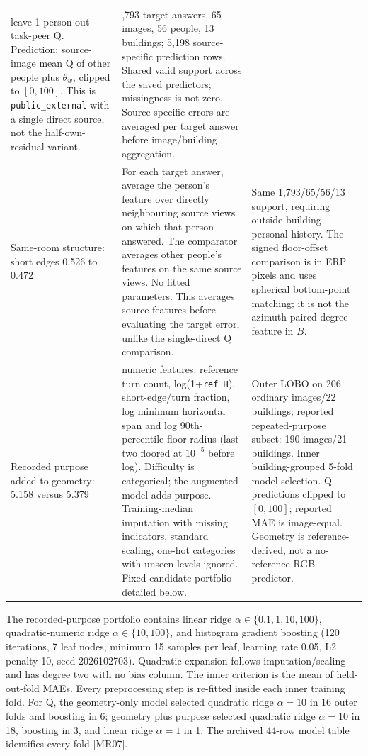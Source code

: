 \begin{longtable}{>{\raggedright\arraybackslash}p{.19\linewidth}>{\raggedright\arraybackslash}p{.49\linewidth}>{\raggedright\arraybackslash}p{.23\linewidth}}
leave-1-person-out task-peer Q.
Prediction: source-image mean Q of other people plus $\theta_w$,
clipped to $[0,100]$.
This is \texttt{public\_external} with a single direct source,
not the half-own-residual variant.
&
1,793 target answers, 65 images, 56 people, 13 buildings;
5,198 source-specific prediction rows.
Shared valid support across the saved predictors; missingness is not zero.
Source-specific errors are averaged per target answer before
image/building aggregation.
\\[3pt]
Same-room structure:
short edges 0.526 to 0.472
&
For each target answer, average the person's feature over directly
neighbouring source views on which that person answered.
The comparator averages other people's features on the same source views.
No fitted parameters. This averages source features before evaluating
the target error, unlike the single-direct Q comparison.
&
Same 1,793/65/56/13 support, requiring outside-building personal history.
The signed floor-offset comparison is in ERP pixels and uses spherical
bottom-point matching; it is not the azimuth-paired degree feature in $B$.
\\[3pt]
Recorded purpose added to geometry:
5.158 versus 5.379
&
5 numeric features: reference turn count, log(1+\texttt{ref\_H}),
short-edge/turn fraction, log minimum horizontal span and log
90th-percentile floor radius (last two floored at $10^{-5}$ before log).
Difficulty is categorical; the augmented model adds purpose.
Training-median imputation with missing indicators, standard scaling,
one-hot categories with unseen levels ignored.
Fixed candidate portfolio detailed below.
&
Outer LOBO on 206 ordinary images/22 buildings; reported repeated-purpose
subset: 190 images/21 buildings.
Inner building-grouped 5-fold model selection.
Q predictions clipped to $[0,100]$; reported MAE is image-equal.
Geometry is reference-derived, not a no-reference RGB predictor.
\\
\bottomrule
\end{longtable}
\endgroup

The recorded-purpose portfolio contains linear ridge
$\alpha\in\{0.1,1,10,100\}$, quadratic-numeric ridge
$\alpha\in\{10,100\}$, and histogram gradient boosting
(120 iterations, 7 leaf nodes, minimum 15 samples per leaf,
learning rate 0.05, L2 penalty 10, seed 2026102703).
Quadratic expansion follows imputation/scaling and has degree two with no
bias column. The inner criterion is the mean of held-out-fold MAEs.
Every preprocessing step is re-fitted inside each inner training fold.
For Q, the geometry-only model selected quadratic ridge $\alpha=10$ in
16 outer folds and boosting in 6; geometry plus purpose selected quadratic
ridge $\alpha=10$ in 18, boosting in 3, and linear ridge $\alpha=1$ in 1.
The archived 44-row model table identifies every fold [MR07].


